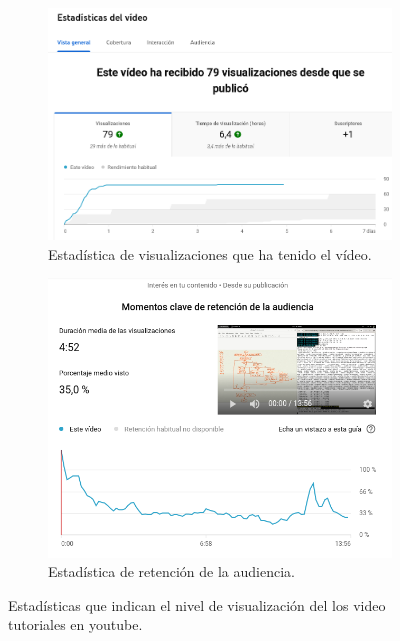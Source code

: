 \documentclass[a4pa<per,12pt,spanish]{article}
\begin{document}
\vspace{2cm}

\begin{figure}[H]
\begin{subfigure}{0.45\textwidth}
    \centering
    \includegraphics[scale=0.3]{images/estadistica1.png}
    
    \caption[tutorias]{Estadística de visualizaciones que ha tenido el vídeo.}
    \label{fig:1}
\end{subfigure} \hspace{2cm}
\begin{subfigure}{0.45\linewidth}
\includegraphics[scale=0.3]{images/estadistica2.png}
    \caption[videotutorias]{Estadística de retención de la audiencia.}
    \label{fig:1}

\end{subfigure}


\caption{Estadísticas que indican el nivel de visualización del los video tutoriales en youtube.}
\label{fig:xx}
\end{figure}
\end{document}
